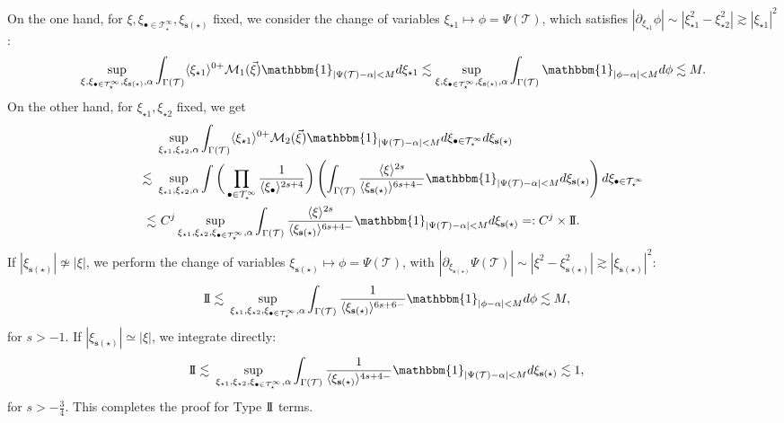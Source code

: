 \documentclass[a4paper,
11pt,  reqno]{amsart}
\newcommand{\jap}[1]{\langle #1 \rangle}
\newcommand{\II}{\textup{I \hspace{-2.9mm} I} }
\newcommand{\5}{\textup{V}}
\newcommand{\les}{\lesssim}
\theoremstyle{remark}
\newcommand{\bul}{\bullet}
\newcommand{\TT}{\mathcal{T}}
\newcommand{\G}{\Gamma}
\newcommand{\sbf}{\mathbf{s}}
\newcommand{\ges}{\gtrsim}
\newcommand{\M}{\mathcal{M}}
\numberwithin{equation}{section}
\numberwithin{theorem}{section}
\begin{document}
{On the one hand, for $\xi, \xi_{\bul\in \TT^\infty_\star}, \xi_{\sbf(\star)}$ fixed, we consider the change of variables $\xi_{\star1}\mapsto \phi=\Psi(\TT)$, which satisfies $|\partial_{\xi_{\star1}} \phi| 
\sim |\xi_{\star1}^2 - \xi_{\star2}^2| \ges 
|\xi_{\star1}|^2$:
\begin{align*}
    \sup_{\xi, \xi_{\bul\in \TT^\infty_\star}, \xi_{\sbf(\star)}, \alpha} \int_{\Gamma(\TT)} \jap{\xi_{\star1}}^{0+}\M_1(\vec\xi) \mathbbm{1}_{|\Psi(\TT)
    -\alpha|<M}d\xi_{\star1}\lesssim \sup_{\xi, \xi_{\bul\in \TT^\infty_\star}, \xi_{\sbf(\star)}, \alpha} \int_{\Gamma(\TT)} \mathbbm{1}_{|\phi-\alpha|<M}d\phi\lesssim M.
\end{align*}
On the other hand, for $\xi_{\star1}, \xi_{\star2}$ fixed, we get
\begin{align*}
    &\sup_{\xi_{\star1}, \xi_{\star2}, \alpha} \int_{\G(\TT)} \jap{\xi_{\star1}}^{0+}\M_2 (\vec\xi) \mathbbm{1}_{|\Psi(\TT)-\alpha|<M}d\xi_{\bul\in\TT^\infty_\star}d\xi_{\sbf(\star)} \\
    \lesssim \ 
    &\sup_{\xi_{\star1}, \xi_{\star2}, \alpha} 
    \int 
    \bigg( \prod_{\bul\in\TT^\infty_\star} \frac{1}{\jap{\xi_\bul}^{2s+4  }}
    \bigg) 
    \left(\int_{\G(\TT)} \frac{\jap{\xi}^{2s}}{\jap{\xi_{\sbf(\star)}}^{6s+4-  }} \mathbbm{1}_{|\Psi(\TT)-\alpha|<M}d\xi_{\sbf(\star)} \right) d\xi_{\bul\in\TT^\infty_\star}\\\lesssim &\  C^j \sup_{\xi_{\star1}, \xi_{\star2}, \xi_{\bul\in\TT^\infty_\star}, \alpha}\int_{\G(\TT)} \frac{\jap{\xi}^{2s}}{\jap{\xi_{\sbf(\star)}}^{6s+4 - }} \mathbbm{1}_{|\Psi(\TT)-\alpha|<M}d\xi_{\sbf(\star)} 
    =: C^j \times \II 
    .
\end{align*}
If $|\xi_{\sbf(\star)}|\not\simeq|\xi|$, we perform the change of variables $\xi_{\sbf(\star)}\mapsto \phi= \Psi(\TT)$, with $|\partial_{\xi_{\sbf(\star)}}\Psi(\TT)|\sim |\xi^2 - \xi_{\sbf(\star)}^2| \ges |\xi_{\sbf(\star)} |^2$:
\begin{align*}
    \II
    \lesssim & \ \sup_{\xi_{\star1}, \xi_{\star2}, \xi_{\bul\in\TT^\infty_\star}, \alpha}\int_{\G(\TT)} \frac{1}{\jap{\xi_{\sbf(\star)}}^{6s+6-}} \mathbbm{1}_{|\phi-\alpha|<M}d\phi \lesssim M, 
\end{align*}
for $s>-1$.
If $|\xi_{\sbf(\star)}|\simeq |\xi|$, we integrate directly:
\begin{align}
 \II
  \les 
  &
  \
  \sup_{\xi_{\star1}, \xi_{\star2}, \xi_{\bul\in\TT^\infty_\star}, \alpha}\int_{\G(\TT)} \frac{1}{\jap{\xi_{\sbf(\star)}}^{4s+4 - }} \mathbbm{1}_{|\Psi(\TT)-\alpha|<M}d\xi_{\sbf(\star)} \les 1, 
\end{align}
for $s>- \frac34$. This completes the proof for Type $\II$ terms. 


}
\end{document}
